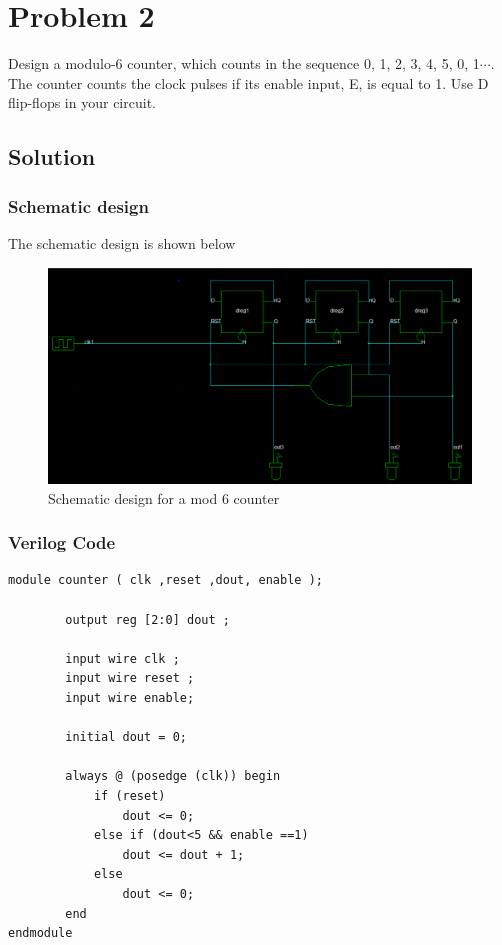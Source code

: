 \documentclass[titlepage]{article}
\begin{document}
\newpage

\section {Problem 2}

\begin{tcolorbox}
    Design a modulo-6 counter, which counts in the sequence 0, 1, 2, 3, 4, 5, 0, 1$\cdots$. The counter counts the clock pulses if its enable input, E, is equal to 1. Use D flip-flops in your circuit.
\end{tcolorbox}

\subsection{Solution}
\subsubsection{Schematic design}
The schematic design is shown below
\begin{figure}[ht]
    \centering
    \includegraphics[scale = 0.4]{dff_sch.png}
    \caption{Schematic design for a mod 6 counter}
\end{figure}
\newpage
\subsubsection{Verilog Code}

\begin{lstlisting}[style={verilog-style}]
    module counter ( clk ,reset ,dout, enable );

        output reg [2:0] dout ;

        input wire clk ;
        input wire reset ;
        input wire enable;

        initial dout = 0;

        always @ (posedge (clk)) begin
            if (reset)
                dout <= 0;
            else if (dout<5 && enable ==1)
                dout <= dout + 1;
            else
                dout <= 0;
        end
endmodule
\end{lstlisting}
\end{document}
